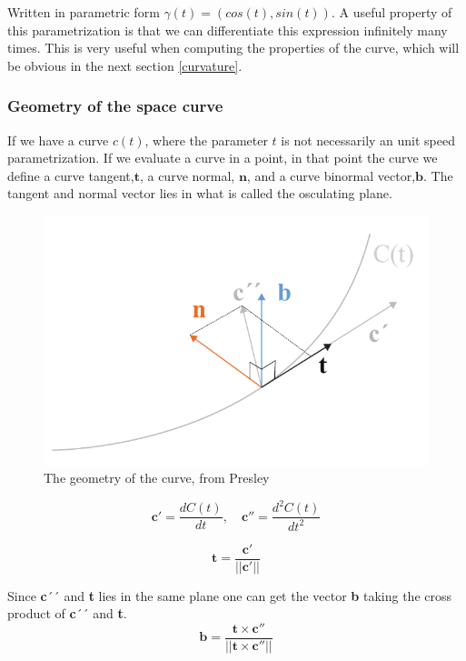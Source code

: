 Written in parametric form $\gamma(t) = (cos(t),sin(t))$. A useful property of this parametrization is that we can differentiate this expression infinitely many times. This is very useful when computing the properties of the curve, which will be obvious in the next section \ref{curvature}.

\subsubsection{Geometry of the space curve} \label{GeoSpaceCurve}

If we have a curve $c(t)$, where the parameter $t$ is not necessarily an unit speed parametrization. If we evaluate a curve in a point, in that point the curve we define a curve tangent,$\textbf{t}$, a curve normal, $\textbf{n}$, and a curve binormal vector,$\textbf{b}$. The tangent and normal vector lies in what is called the osculating plane.

\begin{figure}[H]
\centering
\includegraphics[width=0.7\linewidth ]{figure/Theory/CurveGeometry.pdf}              
\caption{The geometry of the curve, from Presley }
\end{figure}


\begin{equation}
\textbf{c}' =  \frac{d C(t)}{dt}, \quad \textbf{c}''=   \frac{d^2 C(t)}{dt^2}
\end{equation}


\begin{equation}
\textbf{t} = \frac{\textbf{c}'}{||\textbf{c}'||} 
\end{equation}

Since \textbf{c}´´ and \textbf{t} lies in the same plane one can get the vector \textbf{b} taking the cross product of \textbf{c}´´ and \textbf{t}. 
\begin{equation}
\textbf{b} = \frac{\textbf{t} \times \textbf{c}''}{||\textbf{t} \times \textbf{c}''||} 
\end{equation}


